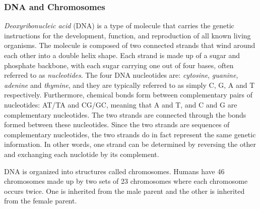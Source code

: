 \subsubsection{DNA and Chromosomes} \label{background:biology:dna_and_chromosomes}
\textit{Deoxyribonucleic acid} (DNA) is a type of molecule that carries the genetic instructions for the development, function, and reproduction of all known living organisms.
The molecule is composed of two connected strands that wind around each other into a double helix shape.
Each strand is made up of a sugar and phosphate backbone, with each sugar carrying one out of four bases, often referred to as \textit{nucleotides}. 
The four DNA nucleotides are: \textit{cytosine}, \textit{guanine}, \textit{adenine} and \textit{thymine}, and they are typically referred to as simply C, G, A and T respectively.
Furthermore, chemical bonds form between complementary pairs of nucleotides: AT/TA and CG/GC, meaning that A and T, and C and G are complementary nucleotides. 
The two strands are connected through the bonds formed between these nucleotides.
Since the two strands are sequences of complementary nucleotides, the two strands do in fact represent the same genetic information. 
In other words, one strand can be determined by reversing the other and exchanging each nuclotide by its complement.

DNA is organized into structures called chromosomes. 
Humans have 46 chromosomes made up by two sets of 23 chromosomes where each chromosome occurs twice. One is inherited from the male parent and the other is inherited from the female parent.

